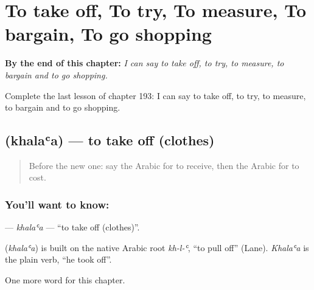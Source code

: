 
\chapter{To take off, To try, To measure, To bargain, To go shopping}
\label{ch:ar-to-take-off-to-try-to-measure-to-bargain-to-go-shopping}

\begin{chapteropening}
\textbf{By the end of this chapter:} \emph{I can say to take off, to try, to measure, to bargain and to go shopping.}

Complete the last lesson of chapter 193: I can say to take off, to try, to measure, to bargain and to go shopping.
\end{chapteropening}

\section[\texorpdfstring{\ar{خلع} (khalaʿa)}{خلع (khalaʿa)}]{ (khalaʿa) — to take off (clothes)}

\label{lesson:AR-C193-khalaa}



\begin{quote}
Before the new one: say the Arabic for to receive, then the Arabic for to cost.
\end{quote}

\subsection*{You'll want to know: }
\textbf{} — \emph{khalaʿa} — \textquotedblleft{}to take off (clothes)\textquotedblright{}.

\begin{cousinweb}
\textbf{} (\emph{khalaʿa}) is built on the native Arabic root \emph{kh-l-ʿ}, \textquotedblleft{}to pull off\textquotedblright{} (Lane). \emph{Khalaʿa} is the plain verb, \textquotedblleft{}he took off\textquotedblright{}.
\end{cousinweb}

\begin{grammarlens}[title={What you've built}]
One more word for this chapter.
\end{grammarlens}

